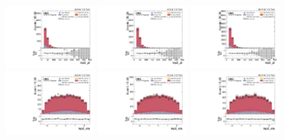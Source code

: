 \begin{figure}[!ht]
  \centering
  \includegraphics[width=0.30\textwidth]{analysis_plots/2016_zjj/cr_vjets_m/lep2_pt.pdf}
  \includegraphics[width=0.30\textwidth]{analysis_plots/2017_zjj/cr_vjets_m/lep2_pt.pdf}
  \includegraphics[width=0.30\textwidth]{analysis_plots/2018_zjj/cr_vjets_m/lep2_pt.pdf} \\
  \includegraphics[width=0.30\textwidth]{analysis_plots/2016_zjj/cr_vjets_m/lep2_eta.pdf}
  \includegraphics[width=0.30\textwidth]{analysis_plots/2017_zjj/cr_vjets_m/lep2_eta.pdf}
  \includegraphics[width=0.30\textwidth]{analysis_plots/2018_zjj/cr_vjets_m/lep2_eta.pdf} \\

\end{figure}

